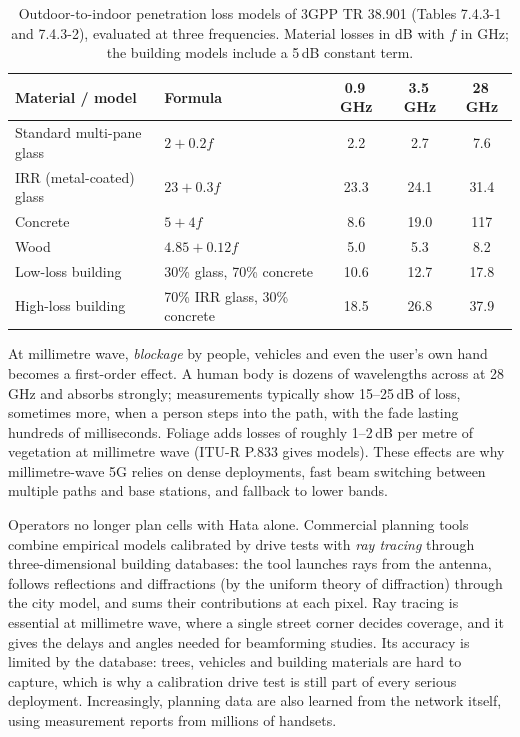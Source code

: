 \begin{table}[htbp]\centering\small
\caption{Outdoor-to-indoor penetration loss models of 3GPP TR 38.901 (Tables 7.4.3-1 and
7.4.3-2), evaluated at three frequencies. Material losses in dB with $f$ in GHz; the building
models include a 5\,dB constant term.}
\label{tab:ch11:o2i}
\begin{tabular}{@{}llccc@{}}
\toprule
Material / model & Formula & 0.9\,GHz & 3.5\,GHz & 28\,GHz\\
\midrule
Standard multi-pane glass & $2+0.2f$ & 2.2 & 2.7 & 7.6\\
IRR (metal-coated) glass & $23+0.3f$ & 23.3 & 24.1 & 31.4\\
Concrete & $5+4f$ & 8.6 & 19.0 & 117\\
Wood & $4.85+0.12f$ & 5.0 & 5.3 & 8.2\\
\midrule
Low-loss building & 30\% glass, 70\% concrete & 10.6 & 12.7 & 17.8\\
High-loss building & 70\% IRR glass, 30\% concrete & 18.5 & 26.8 & 37.9\\
\bottomrule
\end{tabular}
\end{table}



At millimetre wave, \emph{blockage} by people, vehicles and even the user's own hand becomes a
first-order effect. A human body is dozens of wavelengths across at 28\,GHz and absorbs strongly;
measurements typically show 15--25\,dB of loss, sometimes more, when a person steps into the
path, with the fade lasting hundreds of milliseconds. Foliage adds losses of roughly 1--2\,dB per
metre of vegetation at millimetre wave (ITU-R P.833 gives models). These effects are why
millimetre-wave 5G relies on dense deployments, fast beam switching between multiple paths and
base stations, and fallback to lower bands.


\begin{inpractice}
Operators no longer plan cells with Hata alone. Commercial planning tools combine empirical models
calibrated by drive tests with \emph{ray tracing} through three-dimensional building databases:
the tool launches rays from the antenna, follows reflections and diffractions (by the uniform
theory of diffraction) through the city model, and sums their contributions at each pixel. Ray
tracing is essential at millimetre wave, where a single street corner decides coverage, and it
gives the delays and angles needed for beamforming studies. Its accuracy is limited by the
database: trees, vehicles and building materials are hard to capture, which is why a calibration
drive test is still part of every serious deployment. Increasingly, planning data are also
learned from the network itself, using measurement reports from millions of handsets.
\end{inpractice}

